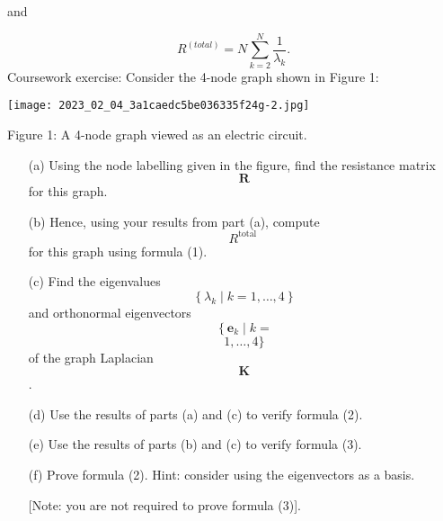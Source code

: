 \documentclass[10pt, a4paper]{article}
\begin{document}
\begin{Problem}
and

\begin{equation*}
R^{(total)}=N \sum_{k=2}^{N} \frac{1}{\lambda_{k}} .
\end{equation*}
Coursework exercise: Consider the 4-node graph shown in Figure 1:
\begin{center}
\texttt{[image: 2023\_02\_04\_3a1caedc5be036335f24g-2.jpg]}
\end{center}
\begin{center}
Figure 1: A 4-node graph viewed as an electric circuit.
\end{center}
\begin{itemize}
\item[(a)] Using the node labelling given in the figure, find the resistance matrix $$\mathbf{R}$$ for this graph.

\item[(b)] Hence, using your results from part (a), compute $$R^{\text {total }}$$ for this graph using formula (1).

\item[(c)] Find the eigenvalues $$\left\{\lambda_{k} \mid k=1, \ldots, 4\right\}$$ and orthonormal eigenvectors $$\left\{\mathbf{e}_{k} \mid k=\right.$$ $$1, \ldots, 4\}$$ of the graph Laplacian $$\mathbf{K}$$.

\item[(d)] Use the results of parts (a) and (c) to verify formula (2).

\item[(e)] Use the results of parts (b) and (c) to verify formula (3).

\item[(f)] Prove formula (2). Hint: consider using the eigenvectors as a basis.

[Note: you are not required to prove formula (3)].
\end{itemize}
\end{Problem}
\end{document}
